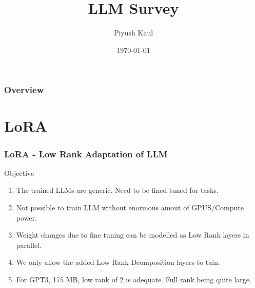 \documentclass{beamer}
\title[LLM Survey]{LLM Survey} %
\author{Piyush Kaul } %
\institute[https://piyushkaul.github.io] %
{
 \\ %
\medskip
\textit{piyushkaul@ieee.org} %
}
\date{\today} %
\theoremstyle{plain}
\theoremstyle{definition}
\theoremstyle{remark}
\numberwithin{equation}{section}
\numberwithin{figure}{section}
\numberwithin{theorem}{section}
\begin{document}
\begin{frame}
\titlepage %
\end{frame}

\begin{frame}
\frametitle{Overview} %
\tableofcontents %
\end{frame}


\section{LoRA} %


\begin{frame}
\frametitle{LoRA - Low Rank Adaptation of LLM}
Objective
\begin{enumerate}
  \item The trained LLMs are generic. Need to be fined tuned for tasks. 
  \item Not possible to train LLM without enormous amout of GPUS/Compute power.
  \item Weight changes due to fine tuning can be modelled as Low Rank layers in parallel.
  \item We only allow the added Low Rank Dcomposition layers to tain.
  \item For GPT3, 175 MB, low rank of 2 is adequate. Full rank being quite large.
\end{enumerate}
\end{frame}
\end{document}
